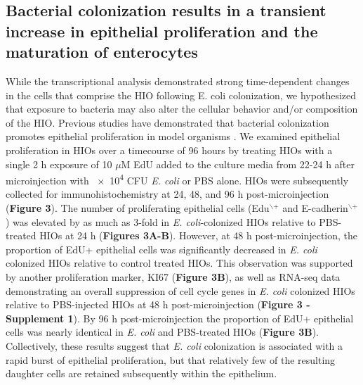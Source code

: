 \documentclass[9pt,lineo]{elife}
\begin{document}
\subsection*{{\bfseries\sffamily } Bacterial colonization results in a transient increase in epithelial proliferation and the maturation of enterocytes}
\label{sec:orgheadline5}
While the transcriptional analysis demonstrated strong time-dependent changes in the cells that comprise the HIO following E. coli colonization, we hypothesized that exposure to bacteria may also alter the cellular behavior and/or composition of the HIO. Previous studies have demonstrated that bacterial colonization promotes epithelial proliferation in model organisms \citep{Bates:2006,Cheesman:2011,Neal:2013,Kremer:2013,Ijssennagger:2015}. We examined epithelial proliferation in HIOs over a timecourse of 96 hours by treating HIOs with a single 2 h exposure of 10 \(\mu\)M EdU added to the culture media from 22-24 h after microinjection with \num{e4} CFU \emph{E. coli} or PBS alone. HIOs were subsequently collected for immunohistochemistry at 24, 48, and 96 h post-microinjection (\textbf{Figure 3}). The number of proliferating epithelial cells (Edu\(^{\text{$\backslash$+}}\) and E-cadherin\(^{\text{$\backslash$+}}\)) was elevated by as much as 3-fold in \emph{E. coli}-colonized HIOs relative to PBS-treated HIOs at 24 h (\textbf{Figures 3A-B}). However, at 48 h post-microinjection, the proportion of EdU+ epithelial cells was significantly decreased in \emph{E. coli} colonized HIOs relative to control treated HIOs. This observation was supported by another proliferation marker, KI67 \citep{Gerdes:1984}(\textbf{Figure 3B}), as well as  RNA-seq data demonstrating an overall suppression of cell cycle genes in \emph{E. coli} colonized HIOs relative to PBS-injected HIOs at 48 h post-microinjection (\textbf{Figure 3 - Supplement 1}). By 96 h post-microinjection the proportion of EdU+ epithelial cells was nearly identical in \emph{E. coli} and PBS-treated HIOs (\textbf{Figure 3B}). Collectively, these results suggest that \emph{E. coli} colonization is associated with a rapid burst of epithelial proliferation, but that relatively few of the resulting daughter cells are retained subsequently within the epithelium. 
\end{document}
